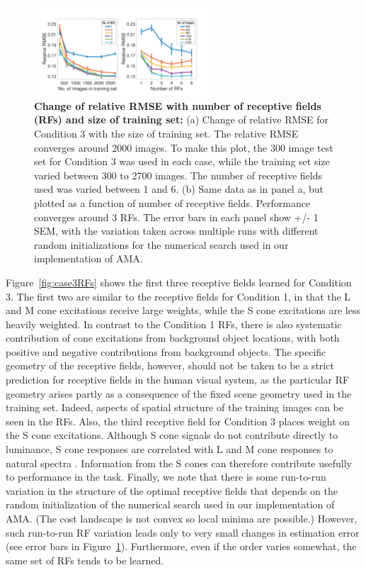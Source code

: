 \documentclass{jov}
\begin{document}
\begin{figure}
\centering
\includegraphics[width=0.6\textwidth]{../FiguresDraft5/Figure13/Figure13.pdf}
\caption{{\bf Change of relative RMSE with number of receptive fields (RFs) and size of training set:} (a) Change of relative RMSE for Condition 3 with the size of training set. The relative RMSE converges around 2000 images. To make this plot, the 300 image test set for Condition 3 was used in each case, while the training set size varied between 300 to 2700 images. The number of receptive fields used was varied between 1 and 6. (b) Same data as in panel a, but plotted as a function of number of receptive fields. Performance converges around 3 RFs. The error bars in each panel show +/- 1 SEM, with the variation taken across multiple runs with different random initializations for the numerical search used in our implementation of AMA.}
 \label{fig:RMSEvsRF}
\end{figure}

Figure~\ref{fig:case3RFs} shows the first three receptive fields learned for Condition 3.
The first two are similar to the receptive fields for Condition 1, in that the L and M cone excitations receive large weights, while the S cone excitations are less heavily weighted.
In contrast to the Condition 1 RFs, there is also systematic contribution of cone excitations from background object locations, with both positive and negative contributions from background objects. 
The specific geometry of the receptive fields, however, should not be taken to be a strict prediction for receptive fields in the human visual system, as the particular RF geometry arises partly as a consequence of the fixed scene geometry used in the training set. 
Indeed, aspects of spatial structure of the training images can be seen in the RFs. 
Also, the third receptive field for Condition 3 places weight on the S cone excitations.
Although S cone signals do not contribute directly to luminance,  S cone responses are correlated with
L and M cone responses to natural spectra \cite{burton1987color, benson2014unsupervised}.
Information from the S cones can therefore contribute usefully to performance in the task. 
Finally, we note that there is some run-to-run variation in the structure of the optimal receptive fields that depends on the random initialization of the numerical search used in our implementation of AMA. 
(The cost landscape is not convex so local minima are possible.) 
However, such run-to-run RF variation leads only to very small changes in estimation error (see error bars in Figure~\ref{fig:RMSEvsRF}). 
Furthermore, even if the order varies somewhat, the same set of RFs tends to be learned.
\end{document}
